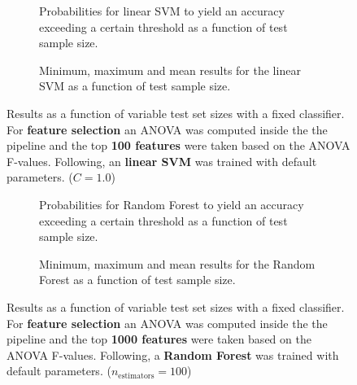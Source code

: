 \begin{figure}
    \captionsetup[subfigure]{justification=justified,singlelinecheck=false}
    \begin{subfigure}[t]{0.61\textwidth}
        
        \caption{Probabilities for linear SVM to yield an accuracy exceeding a certain threshold as a function of test sample size.}
    \end{subfigure}
    \hspace{3.0mm}
    \begin{subfigure}[t]{0.34\textwidth}
        
        \caption{Minimum, maximum and mean results for the linear SVM as a function of test sample size.}
    \end{subfigure}
    \caption[Effects of varying test sample size. Linear SVM; Preprocessing: ANOVA feature selection ($k_\text{best} = \num{100}$)]{Results as a function of variable test set sizes with a fixed classifier. For \textbf{feature selection} an ANOVA was computed inside the the pipeline and the top \textbf{\num{100} features} were taken based on the ANOVA F-values. Following, an \textbf{{linear SVM}} was trained with default parameters. ($C=\num{1.0}$)}
    \label{fig:no_PCA_100_best_selected_LinearSVC}
\end{figure}

\begin{figure}
    \captionsetup[subfigure]{justification=justified,singlelinecheck=false}
    \begin{subfigure}[t]{0.61\textwidth}
        
        \caption{Probabilities for Random Forest to yield an accuracy exceeding a certain threshold as a function of test sample size.}
    \end{subfigure}
    \hspace{3.0mm}
    \begin{subfigure}[t]{0.34\textwidth}
        
        \caption{Minimum, maximum and mean results for the Random Forest as a function of test sample size.}
    \end{subfigure}
    \caption[Effects of varying test sample size. Random Forest; Preprocessing: ANOVA feature selection ($k_\text{best} = \num{1000}$)]{Results as a function of variable test set sizes with a fixed classifier. For \textbf{feature selection} an ANOVA was computed inside the the pipeline and the top \textbf{\num{1000} features} were taken based on the ANOVA F-values. Following, a \textbf{{Random Forest}} was trained with default parameters. ($n_\text{estimators}=\num{100}$)}
    \label{fig:no_PCA_1000_best_selected_RandomForest}
\end{figure}

